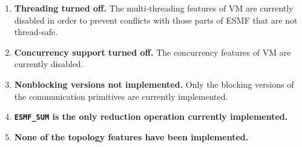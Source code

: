 

\begin{enumerate}

\item {\bf Threading turned off.}  The multi-threading features of VM 
are currently disabled in order to prevent conflicts with those 
parts of ESMF that are not thread-safe.

\item {\bf Concurrency support turned off.}  The concurrency features of 
VM are currently disabled. 

\item {\bf Nonblocking versions not implemented.}  Only the blocking 
versions of the communication primitives are currently implemented.

\item {\bf {\tt ESMF\_SUM} is the only reduction operation 
currently implemented.} 

\item {\bf None of the topology features have been implemented.}

\end{enumerate}


